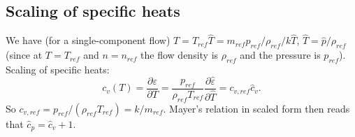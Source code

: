\documentclass[a4paper,11pt,english]{article}
\begin{document}
\subsection{Scaling of specific heats}
We have (for a single-component flow) $T=T_{ref} \hat{T} = m_{ref} p_{ref} / \rho_{ref} / k \hat{T}$, $\hat{T} = \hat{p}/\rho_{ref}$ (since at $T=T_{ref}$ and $n=n_{ref}$ the flow density is $\rho_{ref}$ and the pressure is $p_{ref}$).
Scaling of specific heats:
\begin{equation}
    c_v(T) = \frac{\partial \varepsilon}{\partial T} = \frac{p_{ref}}{\rho_{ref}T_{ref}}\frac{\partial \hat{\varepsilon}}{\partial \hat{T}}=c_{v,ref} \hat{c}_{v}.
\end{equation}
So $c_{v,ref}=p_{ref} / (\rho_{ref}T_{ref}) = k / m_{ref}$. Mayer's relation in scaled form then reads that $\hat{c}_p = \hat{c}_v + 1$.
\end{document}
